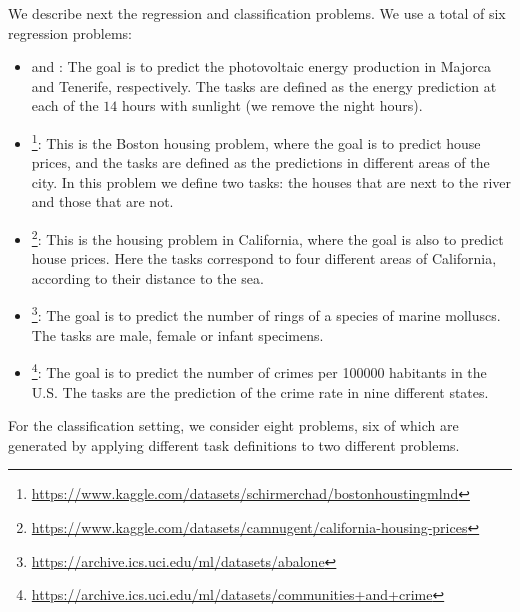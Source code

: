 We describe next the regression and classification problems.
We use a total of six regression problems:
\begin{itemize}
    \item {} and : The goal is to predict the photovoltaic energy production in Majorca and Tenerife, respectively. The tasks are defined as the energy prediction at each of the $14$ hours with sunlight (we remove the night hours).
    \item {}\footnote{\url{https://www.kaggle.com/datasets/schirmerchad/bostonhoustingmlnd}}: This is the Boston housing problem, where the goal is to predict house prices, and the tasks are defined as the predictions in different areas of the city. In this problem we define two tasks: the houses that are next to the river and those that are not. 
    \item {}\footnote{\url{https://www.kaggle.com/datasets/camnugent/california-housing-prices}}: This is the housing problem in California, where the goal is also to predict house prices. Here the tasks correspond to four different areas of California, according to their distance to the sea.
    \item {}\footnote{\url{https://archive.ics.uci.edu/ml/datasets/abalone}}: The goal is to predict the number of rings of a species of marine molluscs. The tasks are male, female or infant specimens.
    \item {}\footnote{\url{https://archive.ics.uci.edu/ml/datasets/communities+and+crime}}: The goal is to predict the number of crimes per \num{100000} habitants in the U.S. The tasks are the prediction of the crime rate in nine different states.
\end{itemize}
For the classification setting, we consider eight problems, six of which are generated by applying different task definitions to two different problems.
